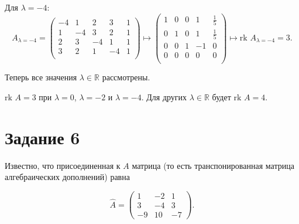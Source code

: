 \documentclass[a4paper,12pt]{article}
\begin{document}
\par
Для $\lambda=-4$:
$$A_{\lambda=-4}=
\begin{pmatrix}
{-4}&{1}&{2}&{3}&{1}\\
{1}&{-4}&{3}&{2}&{1}\\
{2}&{3}&{-4}&{1}&{1}\\
{3}&{2}&{1}&{-4}&{1}\\
\end{pmatrix}
\longmapsto
\begin{pmatrix}
{1}&{0}&{0}&{1}&{\frac{1}{5}}\\
{0}&{1}&{0}&{1}&{\frac{1}{5}}\\
{0}&{0}&{1}&{-1}&{0}\\
{0}&{0}&{0}&{0}&{0}\\
\end{pmatrix}
\longmapsto
\text{rk } A_{\lambda=-4} = 3.
$$
\par

Теперь все значения $\lambda\in \mathbb R$ рассмотрены.\par
\vspace{5pt}
 $\text{rk }A = 3$ при $\lambda = 0$, $\lambda = -2$ и $\lambda = -4$. Для других $\lambda \in \mathbb{R}$ будет $\text{rk }A = 4$.

\section*{Задание 6}
Известно, что присоединенная к $A$ матрица (то есть транспонированная матрица алгебраических дополнений) равна

\[
\widehat A = 
\begin{pmatrix}
1 & -2 & 1\\
3 & -4 & 3\\
-9 & 10 & -7
\end{pmatrix}.
\]
\end{document}
